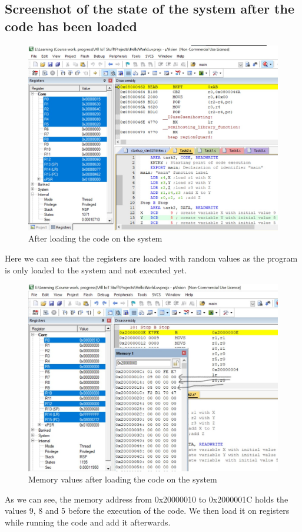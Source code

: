 \documentclass[footheight=20pt, footsepline, headheight=20pt, headsepline]{scrartcl}
\begin{document}
\subsection*{Screenshot of the state of the system after the code has been loaded}
\begin{figure}[ht]
    \centering
    \includegraphics[scale=.75]{images/Task2Before1.jpg}
    \caption{After loading the code on the system}
    \label{fig:before_task_two}
\end{figure}
Here we can see that the registers are loaded with random values as the program is only loaded to the system and not executed yet. 
\FloatBarrier
\begin{figure}[ht]
    \centering
    \includegraphics[scale=.75]{images/Task2Before2.jpg}
    \caption{Memory values after loading the code on the system}
    \label{fig:before_task_two_mem}
\end{figure}
\FloatBarrier
As we can see, the memory address from 0x20000010 to 0x2000001C holds the values 9, 8 and 5 before the execution of the code. We then load it on registers while running the code and add it afterwards.
\end{document}
